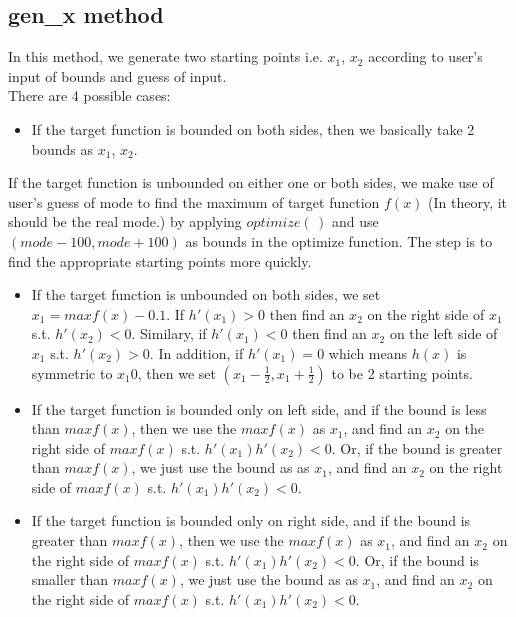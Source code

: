 \documentclass[11pt, oneside]{article}   	%
\begin{document}
\subsection*{ gen\_x method }
In this method, we generate two starting points i.e. $x_{1}$, $x_{2}$ according to user's input of bounds and guess of input. \\
There are 4 possible cases:
  \begin{itemize}
  \item  If the target function is bounded on both sides, then we basically take 2 bounds as $x_{1}$, $x_{2}$.
 \end{itemize}
If the target function is unbounded on either one or both sides, we make use of user's guess of mode to find the maximum of target function $f(x)$ (In theory, it should be the real mode.) by applying $optimize(\,)$ and use $(mode-100, mode+100)$ as bounds in the optimize function. The step is to find the appropriate starting points more quickly.


 \begin{itemize}

  \item  If the target function is unbounded on both sides,  we set $x_{1}=maxf(x)-0.1$. If $h'(x_{1})>0$ then find an $x_{2}$ on the right side of $x_{1}$ s.t. $h'(x_{2})<0$. Similary, if $h'(x_{1})<0$ then find an $x_{2}$ on the left side of $x_{1}$ s.t. $h'(x_{2})>0$. In addition, if $h'(x_{1})=0$ which means $h(x)$ is symmetric to $x_{1}0$, then we set $(x_{1}-\frac{1}{2},x_{1}+\frac{1}{2})$ to be 2 starting points.


  \item  If the target function is bounded only on left side,  and if the bound is less than $maxf(x)$, then we use the $maxf(x)$ as $x_{1}$, and find an $x_{2}$ on the right side of $maxf(x)$ s.t. $h'(x_{1})h'(x_{2})<0$. Or, if the bound is greater than $maxf(x)$, we just use the bound as as $x_{1}$, and find an $x_{2}$ on the right side of $maxf(x)$ s.t. $h'(x_{1})h'(x_{2})<0$.

  \item  If the target function is bounded only on right side,  and if the bound is greater than $maxf(x)$, then we use the $maxf(x)$ as $x_{1}$, and find an $x_{2}$ on the right side of $maxf(x)$ s.t. $h'(x_{1})h'(x_{2})<0$. Or, if the bound is smaller than $maxf(x)$, we just use the bound as as $x_{1}$, and find an $x_{2}$ on the right side of $maxf(x)$ s.t. $h'(x_{1})h'(x_{2})<0$.

 \end{itemize}
\end{document}
